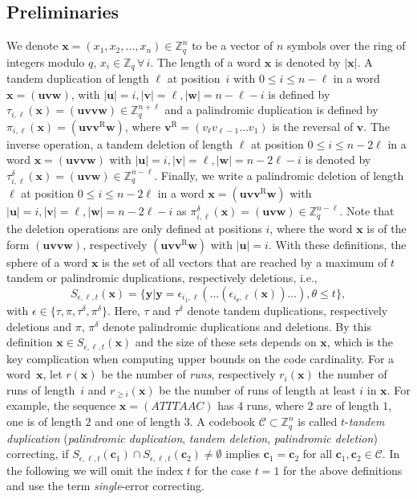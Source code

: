 \documentclass[a4paper]{llncs}
\newcommand{\ve}[1]{\boldsymbol{#1}}
\begin{document}
	\subsection{Preliminaries} \label{ss:preliminaries}
	We denote $\ve{x} = (x_1, x_2, \dots, x_n) \in \mathbb{Z}_q^n$ to be a vector of $n$ symbols over the ring of integers modulo $q$, $x_i \in \mathbb{Z}_q \, \forall \, i$. The length of a word $\boldsymbol{x}$ is denoted by $|\ve{x}|$. A tandem duplication of length $\ell$ at position~$i$ with $0\leq i \leq n-\ell$ in a word $\ve{x} = (\ve{uvw})$, with $|\ve{u}| = i, |\ve{v}| = \ell, |\ve{w}| = n-\ell-i$ is defined by $\tau_{i,\ell}(\ve{x}) = (\ve{uvvw}) \in \mathbb{Z}_q^{n+\ell}$ and a palindromic duplication is defined by $\pi_{i,\ell}(\ve{x}) = (\ve{uv} \ve{v}^\mathrm{R} \ve{w})$, where $\ve{v}^\mathrm{R} = (v_\ell v_{\ell-1} \dots v_1)$ is the reversal of $\ve{v}$. The inverse operation, a tandem deletion of length $\ell$ at position $0\leq i \leq n-2\ell$ in a word $\ve{x} = (\ve{uvvw})$ with $|\ve{u}| = i, |\ve{v}| = \ell, |\ve{w}| = n-2\ell-i$ is denoted by $\tau^\delta_{i,\ell}(\ve{x}) = (\ve{uvw}) \in \mathbb{Z}_q^{n-\ell}$. Finally, we write a palindromic deletion of length $\ell$ at position $0\leq i \leq n-2\ell$ in a word $\ve{x} = (\ve{uv}\ve{v}^\mathrm{R}\ve{w})$ with $|\ve{u}| = i, |\ve{v}| = \ell, |\ve{w}| = n-2\ell-i$ as $\pi^\delta_{i,\ell}(\ve{x}) = (\ve{uvw}) \in \mathbb{Z}_q^{n-\ell}$. Note that the deletion operations are only defined at positions $i$, where the word $\ve{x}$ is of the form $(\ve{uvvw})$, respectively $(\ve{uv}\ve{v}^\mathrm{R}\ve{w})$ with $|\ve{u}| = i$. With these definitions, the sphere of a word $\ve{x}$ is the set of all vectors that are reached by a maximum of $t$ tandem or palindromic duplications, respectively deletions, i.e.,
	\begin{equation} \label{eq:spheres}
	S_{\epsilon, \ell, t}(\ve{x}) = \{\ve{y} | \ve{y} = \epsilon_{i_1, \ell}(...(\epsilon_{i_\theta, \ell}(\ve{x}))...), \theta \leq t\},
	\end{equation}
	with $\epsilon \in  \{\tau, \pi, \tau^\delta, \pi^\delta \} $. Here, $\tau$ and $\tau^\delta$ denote tandem duplications, respectively deletions and $\pi$, $\pi^\delta$ denote palindromic duplications and deletions. By this definition $\ve{x} \in S_{\epsilon, \ell, t}(\ve{x})$ and the size of these sets depends on $\ve{x}$, which is the key complication when computing upper bounds on the code cardinality. For a word~$\ve{x}$, let $r(\ve{x})$ be the number of \emph{runs}, respectively $r_i(\ve{x})$ the number of runs of length~$i$ and $r_{\geq i}(\ve{x})$ be the number of runs of length at least $i$ in $\ve{x}$. For example, the sequence $\ve{x} = (ATTTAAC)$ has $4$ runs, where $2$ are of length $1$, one is of length $2$ and one of length $3$. A codebook $\mathcal{C} \subset \mathbb{Z}_q^n$ is called $t$-\emph{tandem duplication} (\emph{palindromic duplication}, \emph{tandem deletion}, \emph{palindromic deletion}) correcting, if $S_{\epsilon, \ell, t}(\ve{c}_1) \cap S_{\epsilon, \ell, t}(\ve{c}_2) \neq \emptyset$ implies $\ve{c}_1 = \ve{c}_2$ for all $\ve{c}_1, \ve{c}_2 \in \mathcal{C}$. In the following we will omit the index $t$ for the case $t=1$ for the above definitions and use the term \emph{single}-error correcting.
\end{document}
